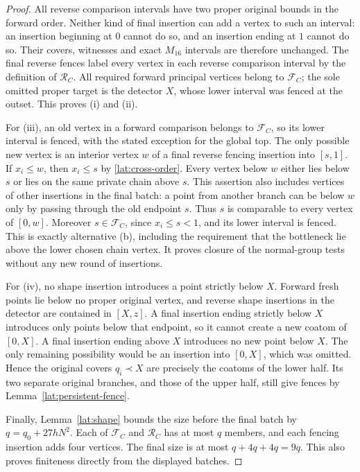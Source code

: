 \begin{proof}
All reverse comparison intervals have two proper original bounds in
the forward order.  Neither kind of final insertion can add a vertex
to such an interval: an insertion beginning at $0$ cannot do so, and
an insertion ending at $1$ cannot do so.  Their covers, witnesses and
exact $M_{16}$ intervals are therefore unchanged.  The final reverse
fences label every vertex in each reverse comparison interval by
the definition of $\mathcal R_C$.  All required forward principal
vertices belong to $\mathcal F_C$; the sole omitted proper target is
the detector $X$, whose lower interval was fenced at the outset.
This proves (i) and (ii).

For (iii), an old vertex in a forward comparison belongs to
$\mathcal F_C$, so its lower interval is fenced, with the stated
exception for the global top.  The only possible new vertex is an
interior vertex $w$ of a final reverse fencing insertion into $[s,1]$.
If $x_i\leq w$, then $x_i\leq s$ by
\eqref{lat:cross-order}.  Every vertex below $w$ either lies below
$s$ or lies on the same private chain above $s$.  This assertion also
includes vertices of other insertions in the final batch: a point
from another branch can be below $w$ only by passing through the old
endpoint $s$.  Thus $s$ is comparable to every vertex of $[0,w]$.
Moreover $s\in\mathcal F_C$, since $x_i\leq s<1$, and its lower
interval is fenced.  This is exactly alternative (b), including the
requirement that the bottleneck lie above the lower chosen chain
vertex.  It proves closure of the normal-group tests without any new
round of insertions.

For (iv), no shape insertion introduces a point strictly below $X$.
Forward fresh points lie below no proper original vertex, and reverse
shape insertions in the detector are contained in $[X,z]$.
A final insertion ending strictly below $X$ introduces only points
below that endpoint, so it cannot create a new coatom of $[0,X]$.
A final insertion ending above $X$ introduces no new point below $X$.
The only remaining possibility would be an insertion into $[0,X]$,
which was omitted.  Hence the original covers $q_i\prec X$ are
precisely the coatoms of the lower half.  Its two separate original
branches, and those of the upper half, still give fences by
Lemma~\ref{lat:persistent-fence}.

Finally, Lemma~\ref{lat:shape} bounds the size before the final batch
by $q=q_0+27hN^2$.  Each of $\mathcal F_C$ and $\mathcal R_C$ has
at most $q$ members, and each fencing insertion adds four vertices.
The final size is at most $q+4q+4q=9q$.  This also proves finiteness
directly from the displayed batches.
\end{proof}


